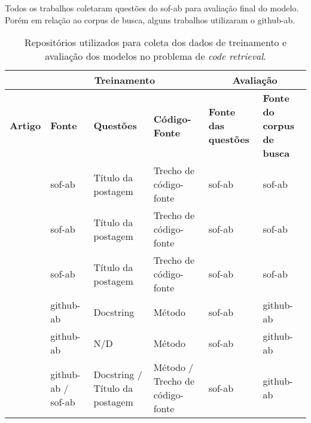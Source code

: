 Todos os trabalhos coletaram questões do \acrfull{sof-ab} para avaliação final do modelo. Porém em relação ao corpus de busca, alguns trabalhos \citep{Gu-deep-code-search:2018, Sachdev-neural-code-search:2018, cambronero-deep-learning-code-search:2019} utilizaram o \acrfull{github-ab}.

\begin{table}[h]
\centering
\begin{tabular}{ p{8em} p{5em} p{5em} p{5em} p{5em} p{5em} }
\hline
 & \multicolumn{3}{c}{\textbf{Treinamento}} & \multicolumn{2}{c}{\textbf{Avaliação}} \\
\hline
\textbf{Artigo} & \textbf{Fonte} & \textbf{Questões} & \textbf{Código-Fonte} & \textbf{Fonte das questões} & \textbf{Fonte do corpus de busca}\\
\hline

\cite{Allamanis-bimodal-source-code-natural-language:2015} & \acrshort{sof-ab} & Título da postagem & Trecho de código-fonte & \acrshort{sof-ab} & \acrshort{sof-ab}\\

\cite{Chen-bi-variational-autoencoder:2018} & \acrshort{sof-ab} & Título da postagem & Trecho de código-fonte & \acrshort{sof-ab} & \acrshort{sof-ab}\\

\cite{iyer-etal-2016-summarizing} & \acrshort{sof-ab} & Título da postagem & Trecho de código-fonte & \acrshort{sof-ab} & \acrshort{sof-ab}\\

\cite{Gu-deep-code-search:2018} & \acrshort{github-ab} & Docstring & Método & \acrshort{sof-ab} & \acrshort{github-ab}\\

\cite{Sachdev-neural-code-search:2018} & \acrshort{github-ab} & N/D & Método	& \acrshort{sof-ab} & \acrshort{github-ab}\\

\cite{cambronero-deep-learning-code-search:2019} & \acrshort{github-ab} / \acrshort{sof-ab} & Docstring / Título da postagem & Método / Trecho de código-fonte & \acrshort{sof-ab} & \acrshort{github-ab}\\

 \hline
 
\end{tabular}
\caption{Repositórios utilizados para coleta dos dados de treinamento e avaliação dos modelos no problema de \textit{code retrieval}.}
\label{table:summary-source-data}
\end{table}


